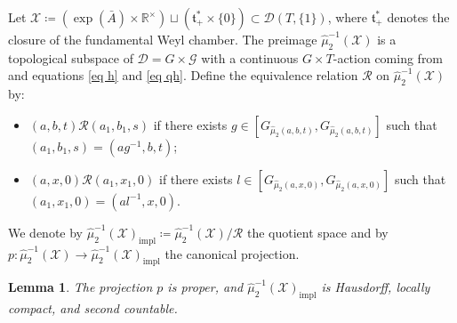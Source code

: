\documentclass[reqno]{amsart}
\theoremstyle{plain}
\newtheorem{Lem}[Thm]{Lemma}
\theoremstyle{definition}
\begin{document}
Let $\mathcal{X} \coloneqq (\exp(\bar{A}) \times \mathbb{R}^\times) \sqcup (\mathfrak{t}^*_+ \times \{0\}) \subset \mathcal{D}(T, \{1\})$, where $\mathfrak{t}^*_+$ denotes the closure of the fundamental Weyl chamber. The preimage $\widehat{\mu}_2^{-1}(\mathcal{X})$ is a topological subspace of $\mathcal{D} = G \times \mathcal{G}$ with a continuous $G\times T$-action coming from \cite[Proposition~2.2]{JMM2025deformations} and equations \eqref{eq h} and \eqref{eq qh}. Define the equivalence relation $\mathcal{R}$ on $\widehat{\mu}_2^{-1}(\mathcal{X})$ by:
\begin{itemize}
\item $(a, b, t) \mathrel{\mathcal{R}} (a_1, b_1, s)$ if there exists $g \in [G_{\widehat{\mu}_2(a,b,t)}, G_{\widehat{\mu}_2(a,b,t)}]$ such that $(a_1, b_1, s) = (ag^{-1}, b, t)$;
\item $(a, x, 0) \mathrel{\mathcal{R}} (a_1, x_1, 0)$ if there exists $l \in [G_{\widehat{\mu}_2(a,x,0)}, G_{\widehat{\mu}_2(a,x,0)}]$ such that $(a_1, x_1, 0) = (al^{-1}, x, 0)$.
\end{itemize}
We denote by $\widehat{\mu}_2^{-1}(\mathcal{X})_{\mathrm{impl}} \coloneqq \widehat{\mu}_2^{-1}(\mathcal{X})/\mathcal{R}$ the quotient space and by $p: \widehat{\mu}_2^{-1}(\mathcal{X}) \to \widehat{\mu}_2^{-1}(\mathcal{X})_{\mathrm{impl}}$ the canonical projection.

\begin{Lem}\label{lem 6.2}
The projection $p$ is proper, and $\widehat{\mu}_2^{-1}(\mathcal{X})_{\mathrm{impl}}$ is Hausdorff, locally compact, and second countable.
\end{Lem}
\end{document}
